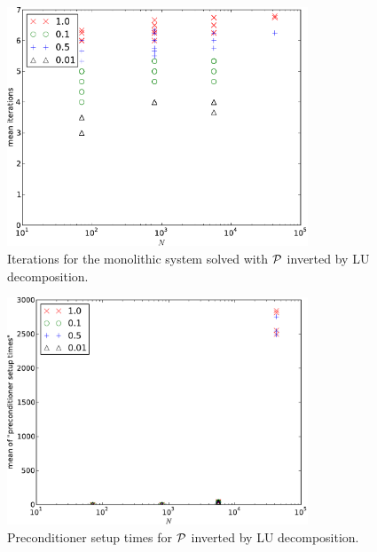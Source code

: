 \begin{figure}
  \centering
  \includegraphics[width=0.8\textwidth]{plots/linear_solvers/som-main-exactimplicitdummy-meanofnsolveritersvsinitialnnode.pdf}
  \caption{Iterations for the monolithic system solved with $\mathcal{P}$ inverted by LU decomposition.}
  \label{fig:its-p1-exact}
\end{figure}


\begin{figure}
  \centering
  \includegraphics[width=0.8\textwidth]{plots/linear_solvers/som-main-exactimplicitdummy-meanofpreconditionersetuptimesvsinitialnnode.pdf}
  \caption{Preconditioner setup times for $\mathcal{P}$ inverted by LU decomposition.}
  \label{fig:times-p1-exact}
\end{figure}

